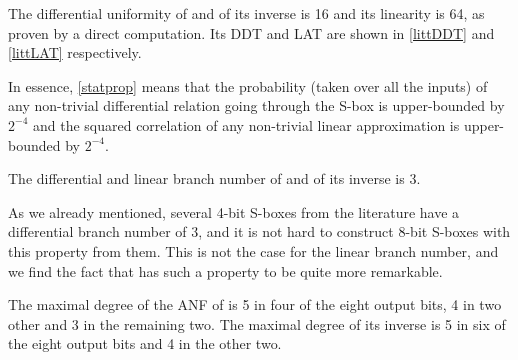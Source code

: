 \begin{prop}
\label{statprop}
The differential uniformity of \littlunOne and of its inverse is 16 and its linearity is 64, as proven by a direct computation.
Its DDT and LAT are shown in \autoref{littDDT} and \autoref{littLAT} respectively.
\end{prop}

In essence, \autoref{statprop} means that the probability (taken over all the inputs) of any non-trivial differential relation going through
the S-box is upper-bounded by $2^{-4}$ and the squared correlation of any non-trivial linear approximation is upper-bounded by $2^{-4}$.

\begin{prop}
The differential and linear branch number of \littlunOne and of its inverse is 3.
\end{prop}

As we already mentioned, several 4-bit S-boxes from the literature have a differential branch number of 3, and it is not hard to construct
8-bit S-boxes with this property from them. This is not the case for the linear branch number, and we find the fact that \littlunOne
has such a property to be quite more remarkable.

\begin{prop}
The maximal degree of the ANF of \littlunOne is 5 in four of the eight output bits,
4 in two other and 3 in the remaining two. The maximal degree of its inverse is 5 in six of the eight output bits
and 4 in the other two.
\end{prop}



